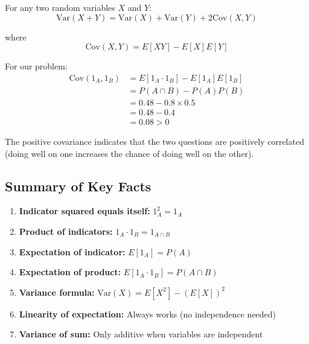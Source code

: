 \documentclass[11pt]{article}
\begin{document}
For any two random variables $X$ and $Y$:
\begin{equation}
\text{Var}(X + Y) = \text{Var}(X) + \text{Var}(Y) + 2\text{Cov}(X, Y)
\end{equation}

where
\begin{equation}
\text{Cov}(X, Y) = E[XY] - E[X]E[Y]
\end{equation}

For our problem:
\begin{align}
\text{Cov}(1_A, 1_B) &= E[1_A \cdot 1_B] - E[1_A]E[1_B]\\
&= P(A \cap B) - P(A)P(B)\\
&= 0.48 - 0.8 \times 0.5\\
&= 0.48 - 0.4\\
&= 0.08 > 0
\end{align}

The positive covariance indicates that the two questions are positively correlated (doing well on one increases the chance of doing well on the other).

\subsection{Summary of Key Facts}

\begin{enumerate}
    \item \textbf{Indicator squared equals itself:} $1_A^2 = 1_A$

    \item \textbf{Product of indicators:} $1_A \cdot 1_B = 1_{A \cap B}$

    \item \textbf{Expectation of indicator:} $E[1_A] = P(A)$

    \item \textbf{Expectation of product:} $E[1_A \cdot 1_B] = P(A \cap B)$

    \item \textbf{Variance formula:} $\text{Var}(X) = E[X^2] - (E[X])^2$

    \item \textbf{Linearity of expectation:} Always works (no independence needed)

    \item \textbf{Variance of sum:} Only additive when variables are independent
\end{enumerate}
\end{document}
